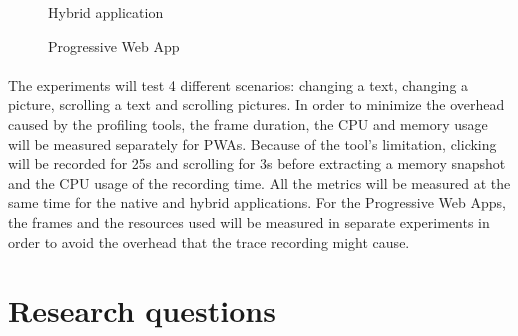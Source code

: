 \begin{figure}
    \centering
    \hfill
    \hfill
    \hfill
    \hfill
    \caption{Hybrid application}
    \label{fig:hybrid_screens}
\end{figure}

\begin{figure}
    \centering
    \hfill
    \hfill
    \hfill
    \hfill
    \caption{Progressive Web App}
    \label{fig:pwa_screens}
\end{figure}

\paragraph{}
The experiments will test 4 different scenarios: changing a text, changing a picture, scrolling a text and scrolling pictures. In order to minimize the overhead caused by the profiling tools, the frame duration, the CPU and memory usage will be measured separately for PWAs.  \newline
Because of the tool's limitation, clicking will be recorded for 25s and scrolling for 3s before extracting a memory snapshot and the CPU usage of the recording time. All the metrics will be measured at the same time for the native and hybrid applications. For the Progressive Web Apps, the frames and the resources used will be measured in separate experiments in order to avoid the overhead that the trace recording might cause.


\section{Research questions}

